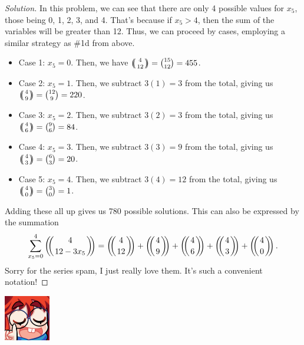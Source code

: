 \documentclass{article}
\newcommand{\multibinom}[2]{
  \left(\!\!\middle(\genfrac{}{}{0pt}{}{#1}{#2}\middle)\!\!\right)} %
\newenvironment{solution}
  {\renewcommand\qedsymbol{$\blacksquare$}\begin{proof}[Solution]}
  {\end{proof}}
\begin{document}
\begin{enumerate}
\begin{solution}
        In this problem, we can see that there are only 4 possible values for $x_5$, those being 0, 1, 2, 3, and 4. That's because if $x_5 > 4$, then the sum of the variables will be greater than 12. Thus, we can proceed by cases, employing 
        a similar strategy as \#1d from above.\begin{itemize} 
            \item Case 1: $x_5 = 0$. Then, we have $\multibinom{4}{12} = \binom{15}{12} = 455$.
            \item Case 2: $x_5 = 1$. Then, we subtract $3(1) = 3$ from the total, giving us $\multibinom{4}{9} = \binom{12}{9} = 220$. 
            \item Case 3: $x_5 = 2$. Then, we subtract $3(2) = 3$ from the total, giving us $\multibinom{4}{6} = \binom{9}{6} = 84$. 
            \item Case 4: $x_5 = 3$. Then, we subtract $3(3) = 9$ from the total, giving us $\multibinom{4}{3} = \binom{6}{3} = 20$. 
            \item Case 5: $x_5 = 4$. Then, we subtract $3(4) = 12$ from the total, giving us $\multibinom{4}{0} = \binom{3}{0} = 1$. 
        \end{itemize} Adding these all up gives us 780 possible solutions. This can also be expressed by the summation\[
            \sum_{x_5 = 0}^4 \multibinom{4}{12-3x_5} = \multibinom{4}{12} + \multibinom{4}{9} + \multibinom{4}{6} + \multibinom{4}{3} + \multibinom{4}{0}.     
        \] Sorry for the series spam, I just really love them. It's such a convenient notation! 
    \end{solution}
    \begin{minipage}[t]{.14\textwidth}
        \vspace{0pt}
        \includegraphics[width=2cm]{nerd_maddy.png} 
    \end{minipage}%
\end{enumerate}
\end{document}
